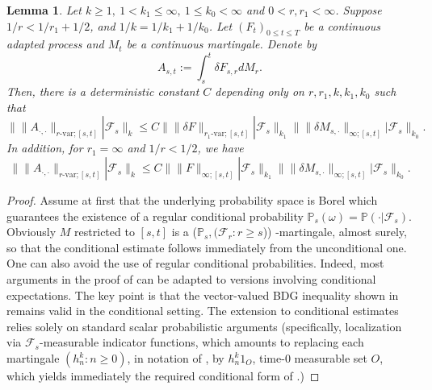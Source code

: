 \documentclass[11pt,reqno]{amsart}
\newtheorem{lemma}{Lemma}[section]
\numberwithin{equation}{section}
\begin{document}
\begin{lemma}\label{lem:p-var martingale estim}
Let $k\ge 1,\ 1<k_1\le \infty,\ 1\le k_{0}<\infty$ and $0<r,r_1 < \infty$. Suppose $1/r < 1/r_1 + 1/2$, and $1/k = 1/k_{1} + 1/k_{0}$. Let $(F_{t})_{0\le t\le T}$ be a continuous adapted process and $M_{t}$ be a continuous martingale. Denote by
\begin{equation*}
A_{s,t} := \int_{s}^{t}\delta F_{s,r} dM_{r}.
\end{equation*}
Then, there is a deterministic constant $C$ depending only on $r,r_1,k,k_1,k_0$ such that 
\begin{equation*}
\big\|\|A_{\bm\cdot,\bm\cdot}\|_{r\text{-}\mathrm{var};[s,t]} | \mathcal F_{s} \big\|_{k} \le C \big\|\|\delta F\|_{r_1\text{-}\mathrm{var};[s,t]} | \mathcal F_{s} \big\|_{k_1} \big\|\|\delta M_{s,\bm\cdot}\|_{\infty;[s,t]} | \mathcal F_{s} \big\|_{k_0}.
\end{equation*}
In addition, for $r_1 = \infty$ and $1/r < 1/2$, we have
\begin{equation*}
\big\|\|A_{\bm\cdot,\bm\cdot}\|_{r\text{-}\mathrm{var};[s,t]} | \mathcal F_{s} \big\|_{k} \le C \big\|\|F\|_{\infty;[s,t]} | \mathcal F_{s}  \big\|_{k_1} \big\|\|\delta M_{s,\bm\cdot}\|_{\infty;[s,t]} | \mathcal F_{s}  \big\|_{k_0}.
\end{equation*}
\end{lemma}

\begin{proof}
Assume at first that the underlying probability space is Borel which
guarantees the existence of a regular conditional probability $\mathbb P_s
(\omega) = \mathbb P (\bm\cdot | \mathcal F_s )$. Obviously $M$
restricted to $[s, t]$ is a  ($\mathbb P_s , (\mathcal F_r : r \geqslant s$))
-martingale, almost surely, so that the conditional estimate follows
immediately from the unconditional one. One can also avoid the use of regular conditional probabilities. Indeed, most arguments in the proof of \cite[Theorem~1.1]{friz2023rough} can be adapted to versions involving conditional expectations. The key point is that the vector-valued BDG inequality shown in \cite[Lemma~2.6]{friz2023rough} remains valid in the conditional setting. The extension to conditional estimates relies solely on standard scalar probabilistic arguments (specifically, localization via $\mathcal F_s$-measurable indicator functions, which amounts to replacing each martingale $(h^k_n: n \ge 0)$, in notation of \cite[Lemma~2.6]{friz2023rough}, by $h^k_n 1_O$, time-$0$ measurable set $O$, which yields immediately the required conditional form of \cite[Lemma~2.6]{friz2023rough}.) 
\end{proof}
\end{document}
